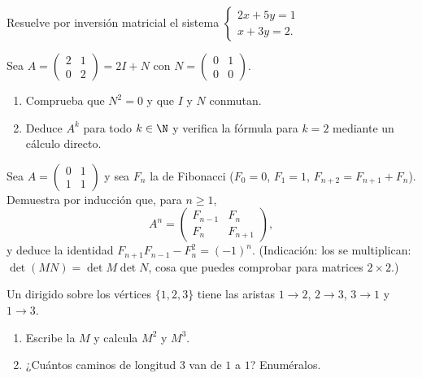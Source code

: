 \begin{exercise}[$\star$]\label{exo:g12:matrix:3}
Resuelve por inversión matricial el sistema
$\begin{cases} 2x + 5y = 1\\ x + 3y = 2 . \end{cases}$
\end{exercise}

\begin{exercise}[$\star\star$]\label{exo:g12:matrix:4}
Sea $A = \begin{pmatrix} 2 & 1\\ 0 & 2\end{pmatrix} = 2I + N$ con
$N = \begin{pmatrix} 0 & 1\\ 0 & 0 \end{pmatrix}$.
\begin{enumerate}
  \item Comprueba que $N^2 = 0$ y que $I$ y $N$ conmutan.
  \item Deduce $A^k$ para todo $k \in \N$ y verifica la fórmula para $k=2$
        mediante un cálculo directo.
\end{enumerate}
\end{exercise}

\begin{exercise}[$\star\star$]\label{exo:g12:matrix:5}
Sea $A = \begin{pmatrix} 0 & 1\\ 1 & 1\end{pmatrix}$ y sea $F_n$ la
 de Fibonacci ($F_0 = 0$, $F_1 = 1$, $F_{n+2} = F_{n+1} + F_n$).
Demuestra por inducción que, para $n \geq 1$,
\[
A^n = \begin{pmatrix} F_{n-1} & F_n\\ F_n & F_{n+1}\end{pmatrix},
\]
y deduce la identidad $F_{n+1}F_{n-1} - F_n^2 = (-1)^n$. (Indicación: los
 se multiplican: $\det(MN) = \det M \det N$, cosa que puedes
comprobar para matrices $2\times2$.)
\end{exercise}

\begin{exercise}[$\star\star$]\label{exo:g12:matrix:6}
Un  dirigido sobre los vértices $\{1, 2, 3\}$ tiene las aristas
$1\to2$, $2\to3$, $3\to1$ y $1\to3$.
\begin{enumerate}
  \item Escribe la  $M$ y calcula $M^2$ y $M^3$.
  \item ¿Cuántos caminos de longitud $3$ van de $1$ a $1$? Enuméralos.
\end{enumerate}
\end{exercise}

